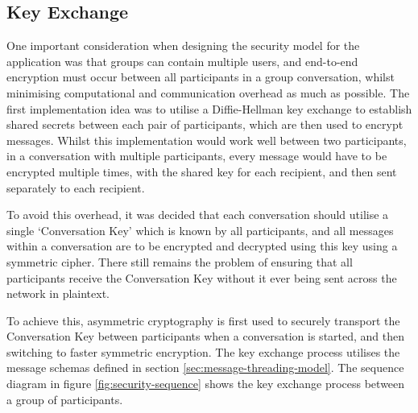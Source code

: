\subsection{Key Exchange}
One important consideration when designing the security model for the application was that groups can contain multiple users, and end-to-end encryption must occur between all participants in a group conversation, whilst minimising computational and communication overhead as much as possible. The first implementation idea was to utilise a Diffie-Hellman key exchange to establish shared secrets between each pair of participants, which are then used to encrypt messages. Whilst this implementation would work well between two participants, in a conversation with multiple participants, every message would have to be encrypted multiple times, with the shared key for each recipient, and then sent separately to each recipient.

To avoid this overhead, it was decided that each conversation should utilise a single `Conversation Key' which is known by all participants, and all messages within a conversation are to be encrypted and decrypted using this key using a symmetric cipher. There still remains the problem of ensuring that all participants receive the Conversation Key without it ever being sent across the network in plaintext.

To achieve this, asymmetric cryptography is first used to securely transport the Conversation Key between participants when a conversation is started, and then switching to faster symmetric encryption. The key exchange process utilises the message schemas defined in section \ref{sec:message-threading-model}. The sequence diagram in figure \ref{fig:security-sequence} shows the key exchange process between a group of participants.

